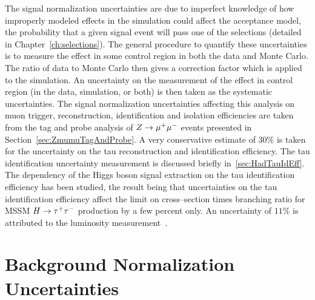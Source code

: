 The signal normalization uncertainties are due to imperfect knowledge of how
improperly modeled effects in the simulation could affect the acceptance model,
the probability that a given signal event will pass one of the selections
(detailed in Chapter~\ref{ch:selections}).  The general procedure to quantify
these uncertainties is to measure the effect in some control region in both the
data and Monte Carlo.  The ratio of data to Monte Carlo then gives a correction
factor which is applied to the simulation.  An uncertainty on the measurement of
the effect in control region (in the data, simulation, or both) is then taken as the
systematic uncertainties.  The signal normalization uncertainties affecting this
analysis on muon trigger, reconstruction, identification and isolation
efficiencies are taken from the tag and probe analysis of $Z \to \mu^+\mu^-$ events
presented in Section~\ref{sec:ZmumuTagAndProbe}.  A very conservative estimate
of $30\%$ is taken for the uncertainty on the tau reconstruction and
identification efficiency.  The tau identification uncertainty measurement is
discussed briefly in~\ref{sec:HadTauIdEff}.  The dependency of the Higgs boson signal
extraction on the tau identification efficiency has been studied, the result
being that uncertainties on the tau identification efficiency affect the limit
on cross--section times branching ratio for MSSM $H \to \tau^+\tau^-$ production by a
few percent only.  An uncertainty of $11\%$ is attributed to the luminosity
measurement~\cite{LUMI}.

\section{Background Normalization Uncertainties}

